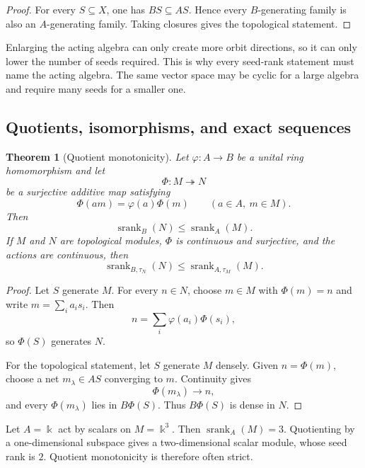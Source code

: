 \documentclass[11pt]{article}
\newtheorem{theorem}{Theorem}[section]
\theoremstyle{definition}
\theoremstyle{remark}
\theoremstyle{definition}\newtheorem{example}[theorem]{Example}
\newcommand{\bbk}{\Bbbk}
\newcommand{\srank}{\operatorname{srank}}
\newcommand{\RecordID}[1]{\label{record:#1}}
\newcommand{\Depends}[1]{}
\newcommand{\Exports}[1]{}
\begin{document}
\begin{proof}
For every $S\subseteq X$, one has $BS\subseteq AS$.  Hence every $B$-generating family is also an $A$-generating family.  Taking closures gives the topological statement.
\end{proof}

\begin{interpretation}
Enlarging the acting algebra can only create more orbit directions, so it can only lower the number of seeds required.  This is why every seed-rank statement must name the acting algebra.  The same vector space may be cyclic for a large algebra and require many seeds for a smaller one.
\end{interpretation}


\subsection{Quotients, isomorphisms, and exact sequences}
\begin{theorem}[Quotient monotonicity]
\label{thm:quotient-monotonicity}
Let $\varphi:A\to B$ be a unital ring homomorphism and let
\[
\Phi:M\twoheadrightarrow N
\]
be a surjective additive map satisfying
\[
\Phi(am)=\varphi(a)\Phi(m)
\qquad(a\in A,\ m\in M).
\]
Then
\[
\boxed{\srank_B(N)\leq\srank_A(M).}
\]
If $M$ and $N$ are topological modules, $\Phi$ is continuous and surjective, and the actions are continuous, then
\[
\srank_{B,\tau_N}(N)\leq\srank_{A,\tau_M}(M).
\]
\end{theorem}
\RecordID{PSC-I-T-QUOTIENT-MONOTONICITY}
\Depends{PSC-I-D-GENERATED-HULL and PSC-I-D-SEED-RANK.}
\Exports{All quotient lower bounds and realization inequalities.}

\begin{proof}
Let $S$ generate $M$.  For every $n\in N$, choose $m\in M$ with $\Phi(m)=n$ and write $m=\sum_ia_is_i$.  Then
\[
n=\sum_i\varphi(a_i)\Phi(s_i),
\]
so $\Phi(S)$ generates $N$.

For the topological statement, let $S$ generate $M$ densely.  Given $n=\Phi(m)$, choose a net $m_\lambda\in AS$ converging to $m$.  Continuity gives
\[
\Phi(m_\lambda)\longrightarrow n,
\]
and every $\Phi(m_\lambda)$ lies in $B\Phi(S)$.  Thus $B\Phi(S)$ is dense in $N$.
\end{proof}

\begin{microexample}[title={A quotient can strictly lower seed rank}]
Let \(A=\bbk\) act by scalars on \(M=\bbk^3\).  Then \(\srank_A(M)=3\).  Quotienting by a one-dimensional subspace gives a two-dimensional scalar module, whose seed rank is \(2\).  Quotient monotonicity is therefore often strict.
\end{microexample}
\end{document}
